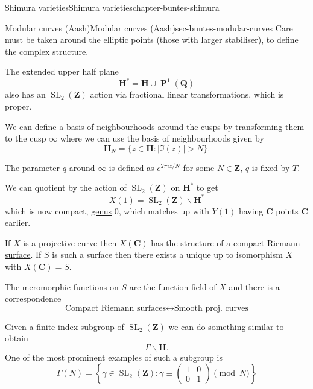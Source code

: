 \documentclass[oneside,10pt,]{book}
\numberwithin{equation}{section}
\newcommand{\ZZ}{\mathbf{Z}}
\newcommand{\QQ}{\mathbf{Q}}
\newcommand{\CC}{\mathbf{C}}
\newcommand{\HH}{\mathbf{H}}
\DeclareMathOperator{\PP}{\mathbf{P}}
\DeclareMathOperator{\SL}{SL}
\newcommand{\gt}{>}
\newcommand{\amp}{&}
\begin{document}
\begin{chapterptx}{Shimura varieties}{}{Shimura varieties}{}{}{chapter-buntes-shimura}
\begin{sectionptx}{Modular curves (Aash)}{}{Modular curves (Aash)}{}{}{sec-buntes-modular-curves}
\hypertarget{p-1029}{}%
Care must be taken around the elliptic points (those with larger stabiliser), to define the complex structure.%
\par
\hypertarget{p-1030}{}%
The extended upper half plane%
\begin{equation*}
\HH^* = \HH \cup \PP^1 (\QQ)
\end{equation*}
also has an \(\SL_2(\ZZ)\) action via fractional linear transformations, which is proper.%
\par
\hypertarget{p-1031}{}%
We can define a basis of neighbourhoods around the cusps by transforming them to the cusp \(\infty\) where we can use the basis of neighbourhoods given by%
\begin{equation*}
\HH_N = \{ z\in \HH : | \Im(z)| \gt N\}\text{.}
\end{equation*}
%
\par
\hypertarget{p-1032}{}%
The parameter \(q\) around \(\infty\) is defined as \(e^{2\pi i z/N}\) for some \(N\in \ZZ\), \(q\) is fixed by \(T\).%
\par
\hypertarget{p-1033}{}%
We can quotient by the action of \(\SL_2(\ZZ) \) on \(\HH^*\) to get%
\begin{equation*}
X(1) = \SL_2(\ZZ) \backslash \HH^*
\end{equation*}
which is now compact, \hyperref[def-class-set]{genus} 0, which matches up with \(Y(1)\) having \(\CC\) points \(\CC\) earlier.%
\par
\hypertarget{p-1034}{}%
If \(X\) is a projective curve then \(X(\CC)\) has the structure of a compact \hyperref[def-top-riem-surface]{Riemann surface}. If \(S\) is such a surface then there exists a unique up to isomorphism \(X\) with \(X(\CC) = S\).%
\par
\hypertarget{p-1035}{}%
The \hyperref[def-morph-riem-surf]{meromorphic functions} on \(S\) are the function field of \(X\) and there is a correspondence%
\begin{equation*}
\text{Compact Riemann surfaces} \leftrightarrow \text{Smooth proj. curves}
\end{equation*}
%
\par
\hypertarget{p-1036}{}%
Given a finite index subgroup of \(\SL_2(\ZZ)\) we can do something similar to obtain%
\begin{equation*}
\Gamma\backslash \HH\text{.}
\end{equation*}
One of the most prominent examples of such a subgroup is%
\begin{equation*}
\Gamma(N) = \left\{ \gamma \in \SL_2(\ZZ) : \gamma \equiv \begin{pmatrix} 1\amp0 \\ 0 \amp 1 \end{pmatrix} \pmod N \right\}

\end{equation*}
\end{sectionptx}
\end{chapterptx}
\end{document}
